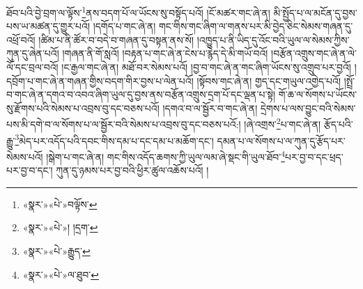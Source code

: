 ཐོབ་པའི་བྱེ་བྲག་ལ་ལྟོས་\footnote{«སྣར་»«པེ་»བལྟོས་}ནས་བདག་པོ་ལ་ཡོངས་སུ་བསྟོད་པའོ། །ངོ་མཚར་གང་ཞེ་ན། མི་སྤྱོད་པ་ལ་མངོན་དུ་བྱས་པས་ཡ་མཚན་དུ་གྱུར་པའོ། །དགོད་པ་གང་ཞེ་ན། གང་གིས་གང་ཞིག་ལ་གནས་པར་མི་བྱེད་ཅིང་སེམས་གཞན་དུ་འཕྲོ་བའོ། །ཚིམ་པ་ནི་ཚོར་བ་བདེ་བ་གཞན་དུ་བསྟན་ནས་སོ། །འཁྱུད་པ་ནི་ཡིད་དུ་འོང་བའི་ཡུལ་ལ་སེམས་ཀྱིས་ཀུན་དུ་ཞེན་པའོ། །གཞན་ནི་གོ་སླའོ། །བརྟན་པ་གང་ཞེ་ན་ངེས་པ་རྙེད་དེ་མི་གཡོ་བའོ། །བརྩོན་འགྲུས་གང་ཞེ་ན་ལེ་ལོ་དང་བྲལ་བའོ། །ང་རྒྱལ་གང་ཞེ་ན། མཐོ་བར་སེམས་པའོ། །བྱ་བ་གང་ཞེ་ན་གང་ཞིག་ཡོངས་སུ་འགྲུབ་པར་བྱའོ། །དབྲོག་པ་གང་ཞེ་ན་གཞན་གྱིས་བདག་གིར་བྱས་པ་ལེན་པའོ། །སྟོབས་གང་ཞེ་ན། གྱད་དང་གཡུལ་འགྱེད་པའོ། །སྤྲོ་བ་གང་ཞེ་ན་དགའ་བ་འབའ་ཞིག་ཡུལ་དུ་བྱས་ནས་བརྩོན་འགྲུས་དྲག་པོ་དང་ལྡན་པ་སྟེ། གོ་ཆ་ལ་སོགས་པ་ཡོངས་སུ་རྫོགས་པའི་སེམས་པ་འབྲས་བུ་དང་བཅས་པའོ། །དགའ་བ་ལ་སྦྱོར་བ་གང་ཞེ་ན། དྲེགས་པ་ལས་བྱུང་བའི་སེམས་པས་མི་དགེ་བ་ལ་སོགས་པ་ལ་སྦྱོར་བའི་སེམས་པ་འབྲས་བུ་དང་བཅས་པའོ:། །ཞེ་འགྲས་\footnote{«སྣར་»«པེ་»། །དྲག་}པ་གང་ཞེ་ན། རྩོད་པའི་རྒྱུ་\footnote{«སྣར་»«པེ་»རྒྱུད་}མེད་པར་འདོད་པའི་དབང་གིས་དམ་པ་དང་དམ་པ་མཆོག་དང་། དམན་པ་ལ་སོགས་པ་ལ་ཀུན་དུ་རྩོད་པར་སེམས་པའོ། །སྒེག་པ་གང་ཞེ་ན། གང་གིས་འདོད་ཆགས་ཀྱི་ཡུལ་ལམ་ཞེ་སྡང་གི་ཡུལ་ཐོབ་\footnote{«སྣར་»«པེ་»ལ་ཐུབ་}པར་བྱ་བ་དང་ཕྲད་པར་བྱ་བ་དང་། ཀུན་དུ་ཉམས་པར་བྱ་བའི་ཕྱིར་ཚུལ་འཆོས་པའོ། །
